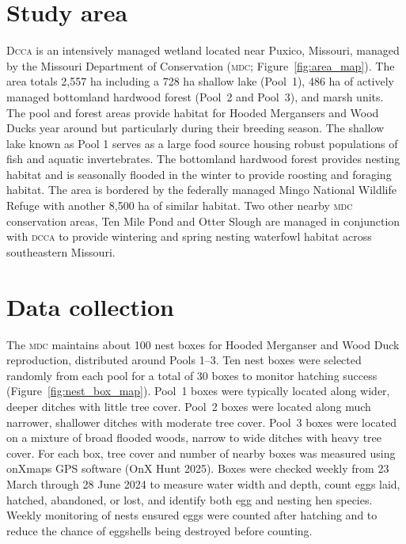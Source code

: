 
\section*{Study area}

D\textsc{cca} is an intensively managed wetland located near Puxico, Missouri, managed by the Missouri Department of Conservation (\textsc{mdc}; Figure~\ref{fig:area_map}). The area totals 2,557 ha including a 728 ha shallow lake (Pool~1), 486 ha of actively managed bottomland hardwood forest (Pool~2 and Pool~3), and marsh units. The pool and forest areas provide habitat for Hooded Mergansers and Wood Ducks year around but particularly during their breeding season. The shallow lake known as Pool 1 serves as a large food source housing robust populations of fish and aquatic invertebrates. The bottomland hardwood forest provides nesting habitat and is seasonally flooded in the winter to provide roosting and foraging habitat. The area is bordered by the federally managed Mingo National Wildlife Refuge with another 8,500 ha of similar habitat.  Two other nearby \textsc{mdc} conservation areas, Ten Mile Pond and Otter Slough are managed in conjunction with \textsc{dcca} to provide wintering and spring nesting waterfowl habitat across southeastern Missouri. 

 


\section*{Data collection}

The \textsc{mdc} maintains about 100 nest boxes for Hooded Merganser and Wood Duck reproduction, distributed around Pools 1–3.  Ten nest boxes were selected randomly from each pool for a total of 30 boxes to monitor hatching success (Figure~\ref{fig:nest_box_map}).  Pool~1  boxes were typically located along wider, deeper ditches with little tree cover. Pool~2 boxes were located along much narrower, shallower ditches with moderate tree cover. Pool~3 boxes were located on a mixture of broad flooded woods, narrow to wide ditches with heavy tree cover. For each box, tree cover and number of nearby boxes was measured using onXmaps GPS software (OnX Hunt 2025). Boxes were checked weekly from 23 March through 28 June 2024 to measure water width and depth, count eggs laid, hatched, abandoned, or lost, and identify both egg and nesting hen species. Weekly monitoring of nests ensured eggs were counted after hatching and to reduce the chance of eggshells being destroyed before counting. 

